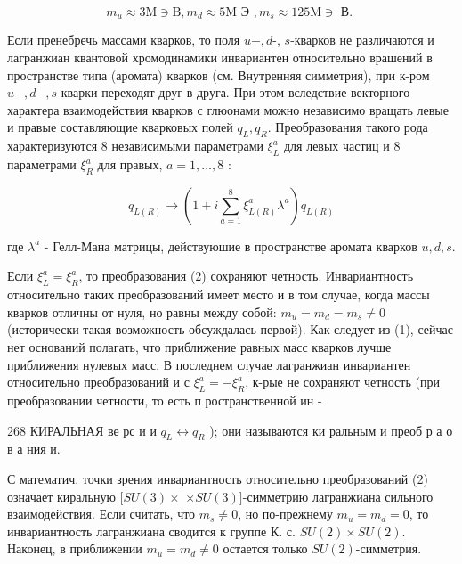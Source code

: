 \documentclass[10pt]{article}
\begin{document}
\[

m_{u} \approx 3 \mathrm{M} \ni \mathrm{B}, m_{d} \approx 5 \mathrm{M} \text { Э }, m_{s} \approx 125 \mathrm{M} \ni \text { В. }

\]



Если пренебречь массами кварков, то поля $u-, d$-, $s$-кварков не различаются и лагранжиан квантовой хромодинамики инвариантен относительно врашений в пространстве типа (аромата) кварков (см. Внутренняя симметрия), при к-ром $u-, d-, s$-кварки переходят друг в друга. При этом вследствие векторного характера взаимодействия кварков с глюонами можно независимо вращать левые и правые составляющие кварковых полей $q_{L}, q_{R}$. Преобразования такого рода характеризуются 8 независимыми параметрами $\xi_{L}^{a}$ для левых частиц и 8 параметрами $\xi_{R}^{a}$ для правых, $a=1, \ldots, 8$ :



\[

q_{L(R)} \rightarrow\left(1+i \sum_{a=1}^{8} \xi_{L(R)}^{a} \lambda^{a}\right) q_{L(R)}

\]



где $\lambda^{a}$ - Гелл-Мана матрицы, действуюшие в пространстве аромата кварков $u, d, s$.



Если $\xi_{L}^{a}=\xi_{R}^{a}$, то преобразования (2) сохраняют четность. Инвариантность относительно таких преобразований имеет место и в том случае, когда массы кварков отличны от нуля, но равны между собой: $m_{u}=m_{d}=m_{s} \neq 0$ (исторически такая возможность обсуждалась первой). Как следует из (1), сейчас нет оснований полагать, что приближение равных масс кварков лучше приближения нулевых масс. В последнем случае лагранжиан инвариантен относительно преобразований и с $\xi_{L}^{a}=-\xi_{R}^{a}$, к-рые не сохраняют четность (при преобразовании четности, то есть п ространственной ин -



268 КИРАЛЬНАЯ ве рс и и $q_{L} \leftrightarrow q_{R}$ ); они называются ки ральным и преоб р а о в а ния и.



С математич. точки зрения инвариантность относительно преобразований (2) означает киральную $[S U(3) \times$ $\times S U(3)]$-симметрию лагранжиана сильного взаимодействия. Если считать, что $m_{s} \neq 0$, но по-прежнему $m_{u}=m_{d}=0$, то инвариантность лагранжиана сводится к группе К. с. $S U(2) \times S U(2)$. Наконец, в приближении $m_{u}=m_{d} \neq 0$ остается только $S U(2)$-симметрия.
\end{document}
